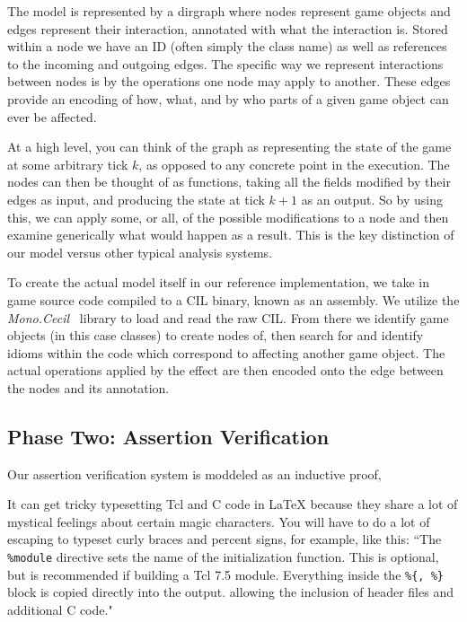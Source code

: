 \documentclass[letterpaper,twocolumn,10pt]{article}
\begin{document}
The model is represented by a dirgraph where nodes represent game objects and edges represent their interaction, annotated with what the interaction is. Stored within a node we have an ID (often simply the class name) as well as references to the incoming and outgoing edges. The specific way we represent interactions between nodes is by the operations one node may apply to another. These edges provide an encoding of how, what, and by who parts of a given game object can ever be affected. 

At a high level, you can think of the graph as representing the state of the game at some arbitrary tick $k$, as opposed to any concrete point in the execution. The nodes can then be thought of as functions, taking all the fields modified by their edges as input, and producing the state at tick $k + 1$ as an output. So by using this, we can apply some, or all, of the possible modifications to a node and then examine generically what would happen as a result. This is the key distinction of our model versus other typical analysis systems.

To create the actual model itself in our reference implementation, we take in game source code compiled to a CIL binary, known as an assembly. We utilize the \textit{Mono.Cecil}~\cite{Mono.Cecil} library to load and read the raw CIL. From there we identify game objects (in this case classes) to create nodes of, then search for and identify idioms within the code which correspond to affecting another game object. The actual operations applied by the effect are then encoded onto the edge between the nodes and its annotation. 

\subsection{Phase Two: Assertion Verification}

Our assertion verification system is moddeled as an inductive proof,


It can get tricky typesetting Tcl and C code in LaTeX because they share
a lot of mystical feelings about certain magic characters.  You
will have to do a lot of escaping to typeset curly braces and percent
signs, for example, like this:
``The {\tt \%module} directive
sets the name of the initialization function.  This is optional, but is
recommended if building a Tcl 7.5 module.
Everything inside the {\tt \%\{, \%\}}
block is copied directly into the output. allowing the inclusion of
header files and additional C code." \\
\end{document}
